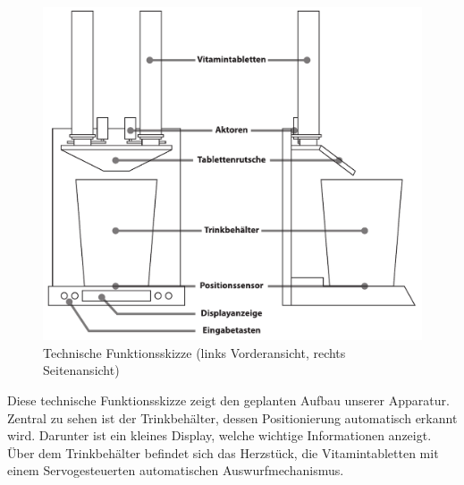 \begin{figure}[H]
	\centering
	\includegraphics[width=1.0\linewidth]{chapter/Bilder/schematic_bw}
	\caption{Technische Funktionsskizze (links Vorderansicht, rechts Seitenansicht)}
	\label{fig:schematicbw}
\end{figure}

Diese technische Funktionsskizze zeigt den geplanten Aufbau unserer Apparatur. Zentral zu sehen ist der Trinkbehälter, dessen Positionierung automatisch erkannt wird. Darunter ist ein kleines Display, welche wichtige Informationen anzeigt. Über dem Trinkbehälter befindet sich das Herzstück, die Vitamintabletten mit einem Servogesteuerten automatischen Auswurfmechanismus.

